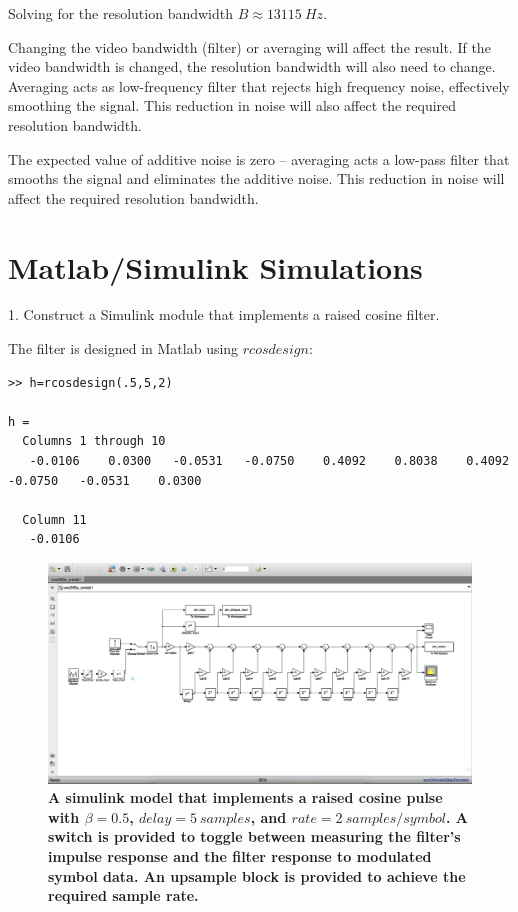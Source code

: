 \documentclass[letterpaper,12pt]{article}
\begin{document}
Solving for the resolution bandwidth $B\approx13115\ Hz$.

Changing the video bandwidth (filter) or averaging will affect the result. If
the video bandwidth is changed, the resolution bandwidth will also need to
change. Averaging acts as low-frequency filter that rejects high frequency
noise, effectively smoothing the signal. This reduction in noise will also
affect the required resolution bandwidth.

The expected value of additive noise is zero – averaging acts a low-pass filter
that smooths the signal and eliminates the additive noise. This reduction in
noise will affect the required resolution
bandwidth.
\pagebreak

\section*{Matlab/Simulink Simulations}

1. Construct a Simulink module that implements a raised cosine filter.

The filter is designed in Matlab using $rcosdesign$:

\begin{verbatim}
>> h=rcosdesign(.5,5,2)

h =
  Columns 1 through 10
   -0.0106    0.0300   -0.0531   -0.0750    0.4092    0.8038    0.4092   -0.0750   -0.0531    0.0300

  Column 11
   -0.0106
\end{verbatim}

\begin{figure}[hbtp]
\includegraphics[width=1.0\columnwidth]{prelab1-simulation-diagram}
\caption{
\label{fig:prelab1-simulation-diagram}
{\bf A simulink model that implements a raised cosine pulse with $\beta=0.5$,
$delay = 5\ samples$, and $rate = 2\ samples/symbol$. A switch is provided to
toggle between measuring the filter's impulse response and the filter response
to modulated symbol data. An upsample block is provided to achieve the required
sample rate.
}
}
\end{figure}
\end{document}
